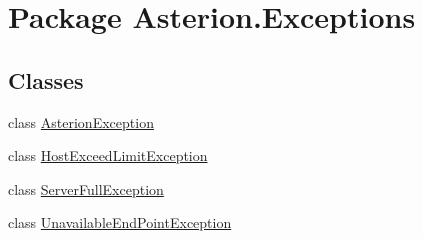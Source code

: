 \hypertarget{namespaceAsterion_1_1Exceptions}{\section{Package Asterion.\-Exceptions}
\label{namespaceAsterion_1_1Exceptions}
}
\subsection*{Classes}
\begin{DoxyCompactItemize}
\item 
class \hyperlink{classAsterion_1_1Exceptions_1_1AsterionException}{Asterion\-Exception}
\item 
class \hyperlink{classAsterion_1_1Exceptions_1_1HostExceedLimitException}{Host\-Exceed\-Limit\-Exception}
\item 
class \hyperlink{classAsterion_1_1Exceptions_1_1ServerFullException}{Server\-Full\-Exception}
\item 
class \hyperlink{classAsterion_1_1Exceptions_1_1UnavailableEndPointException}{Unavailable\-End\-Point\-Exception}
\end{DoxyCompactItemize}
